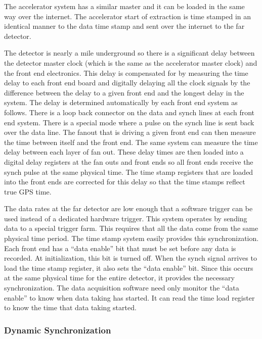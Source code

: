 The accelerator system has a similar master and it can be loaded in
the same way over the internet.  The accelerator start of extraction
is time stamped in an identical manner to the data time stamp and sent
over the internet to the far detector.

The detector is nearly a mile underground so there is a significant
delay between the detector master clock (which is the same as the
accelerator master clock) and the front end electronics.  This delay
is compensated for by measuring the time delay to each front end board
and digitally delaying all the clock signals by the difference between
the delay to a given front end and the longest delay in the system.
The delay is determined automatically by each front end system as
follows.  There is a loop back connector on the data and synch lines
at each front end system.  There is a special mode where a pulse on
the synch line is sent back over the data line.  The fanout that is
driving a given front end can then measure the time between itself and
the front end.  The same system can measure the time delay between
each layer of fan out.  These delay times are then loaded into a
digital delay registers at the fan outs and front ends so all front
ends receive the synch pulse at the same physical time.  The time
stamp registers that are loaded into the front ends are corrected for
this delay so that the time stamps reflect true GPS time.

The data rates at the far detector are low enough that a software
trigger can be used instead of a dedicated hardware trigger.  This
system operates by sending data to a special trigger farm.  This
requires that all the data come from the same physical time period.
The time stamp system easily provides this synchronization.  Each
front end has a ``data enable'' bit that must be set before any data is
recorded.  At initialization, this bit is turned off.  When the synch
signal arrives to load the time stamp register, it also sets the ``data
enable'' bit.  Since this occurs at the same physical time for the
entire detector, it provides the necessary synchronization.  The data
acquisition software need only monitor the ``data enable'' to know when
data taking has started.  It can read the time load register to know
the time that data taking started.

\subsubsection{Dynamic Synchronization}

